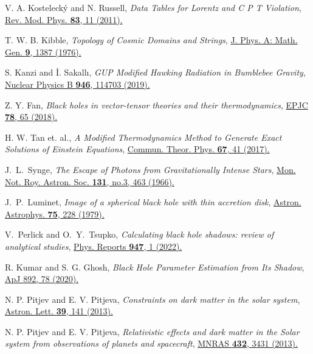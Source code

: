\documentclass[aps,amsmath,amssymb,showpacs,showkeys]{revtex4}
\begin{document}
\begin{thebibliography}{99}
 V. A. Kostelecký and N. Russell, \textit{Data Tables for Lorentz and C P T Violation}, \href{https://doi.org/10.1103/RevModPhys.83.11}{Rev. Mod. Phys. \textbf{83}, 11 (2011).}

 T. W. B. Kibble, \textit{Topology of Cosmic Domains and Strings}, \href{https://doi.org/10.1088/0305-4470/9/8/029}{J. Phys. A: Math. Gen. \textbf{9}, 1387 (1976).}

 S. Kanzi and İ. Sakallı, \textit{GUP Modified Hawking Radiation in Bumblebee Gravity}, \href{https://www.sciencedirect.com/science/article/pii/S0550321319301890?via%3Dihub}{Nuclear Physics B
\textbf{946}, 114703 (2019).}

Z. Y. Fan, \textit{Black holes in vector-tensor theories and their thermodynamics}, \href{https://link.springer.com/article/10.1140/epjc/s10052-018-5540-7}{EPJC \textbf{78}, 65 (2018).}

 H. W. Tan et. al., \textit{A Modified Thermodynamics Method to Generate Exact Solutions of Einstein Equations}, 
\href{https://iopscience.iop.org/article/10.1088/0253-6102/67/1/41}{Commun. Theor. Phys. \textbf{67}, 41 (2017).}

J.~L.~Synge, {\it The Escape of Photons from Gravitationally Intense Stars}, \href{https://academic.oup.com/mnras/article/131/3/463/2603317}{Mon. Not. Roy. Astron. Soc. \textbf{131}, no.3, 463 (1966).}

J.~P.~Luminet, {\it Image of a spherical black hole with thin accretion disk},
\href{https://adsabs.harvard.edu/full/1979A%26A....75..228L}{Astron. Astrophys. \textbf{75}, 228 (1979).}


V.~Perlick and O.~Y.~Tsupko, {\it Calculating black hole shadows: review of analytical studies}, \href{https://www.sciencedirect.com/science/article/abs/pii/S0370157321003811?via%3Dihub}{Phys. Reports \textbf{947}, 1 (2022).}

R. Kumar and S. G. Ghosh, {\it Black Hole Parameter Estimation from Its Shadow}, \href{https://iopscience.iop.org/article/10.3847/1538-4357/ab77b0}{ApJ 892, 78 (2020).}

N. P. Pitjev and E. V. Pitjeva, \textit{Constraints on dark matter in the solar system}, \href{https://link.springer.com/article/10.1134/S1063773713020060}{Astron. Lett. \textbf{39}, 141 (2013).}

N. P. Pitjev and E. V. Pitjeva, \textit{Relativistic effects and dark matter in the Solar system from observations of planets and spacecraft}, \href{https://doi.org/10.1093/mnras/stt695}{MNRAS \textbf{432}, 3431 (2013).}


\end{thebibliography}
\end{document}
